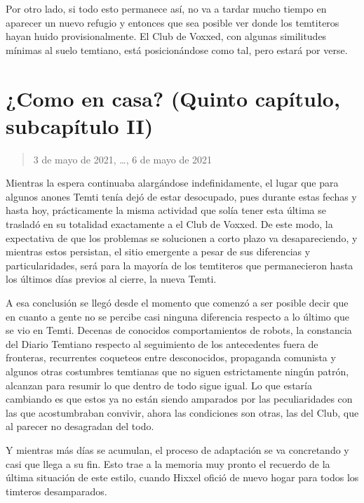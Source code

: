 \documentclass[
  spanish,
]{book}
\begin{document}
Por otro lado, si todo esto permanece así, no va a tardar mucho tiempo en aparecer un nuevo refugio y entonces que sea posible ver donde los temtiteros hayan huido provisionalmente. El Club de Voxxed, con algunas similitudes mínimas al suelo temtiano, está posicionándose como tal, pero estará por verse.

\hypertarget{como-en-casa-quinto-capuxedtulo-subcapuxedtulo-ii}{%
\section{¿Como en casa? (Quinto capítulo, subcapítulo II)}\label{como-en-casa-quinto-capuxedtulo-subcapuxedtulo-ii}}

\begin{quote}
3 de mayo de 2021, \ldots, 6 de mayo de 2021
\end{quote}

Mientras la espera continuaba alargándose indefinidamente, el lugar que para algunos anones Temti tenía dejó de estar desocupado, pues durante estas fechas y hasta hoy, prácticamente la misma actividad que solía tener esta última se trasladó en su totalidad exactamente a el Club de Voxxed. De este modo, la expectativa de que los problemas se solucionen a corto plazo va desapareciendo, y mientras estos persistan, el sitio emergente a pesar de sus diferencias y particularidades, será para la mayoría de los temtiteros que permanecieron hasta los últimos días previos al cierre, la nueva Temti.

A esa conclusión se llegó desde el momento que comenzó a ser posible decir que en cuanto a gente no se percibe casi ninguna diferencia respecto a lo último que se vio en Temti. Decenas de conocidos comportamientos de robots, la constancia del Diario Temtiano respecto al seguimiento de los antecedentes fuera de fronteras, recurrentes coqueteos entre desconocidos, propaganda comunista y algunos otras costumbres temtianas que no siguen estrictamente ningún patrón, alcanzan para resumir lo que dentro de todo sigue igual. Lo que estaría cambiando es que estos ya no están siendo amparados por las peculiaridades con las que acostumbraban convivir, ahora las condiciones son otras, las del Club, que al parecer no desagradan del todo.

Y mientras más días se acumulan, el proceso de adaptación se va concretando y casi que llega a su fin. Esto trae a la memoria muy pronto el recuerdo de la última situación de este estilo, cuando Hixxel ofició de nuevo hogar para todos los timteros desamparados.
\end{document}
